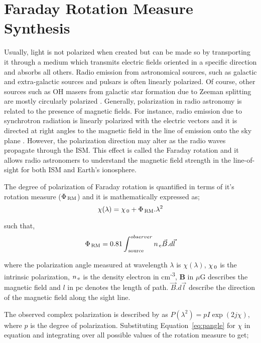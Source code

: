 \section{Faraday Rotation Measure Synthesis}	    \label{chap3:Faraday}
Usually, light is not polarized when created but can be made so by transporting it through a medium which transmits electric fields oriented in a specific direction and absorbs all others. 
Radio emission from astronomical sources, such as galactic and extra-galactic sources and pulsars is often linearly polarized. Of course, other sources such as OH masers from galactic star formation due to Zeeman splitting 
are mostly circularly polarized \citep{2008ApJ...680..981R}. Generally, polarization in radio astronomy is related to the presence of magnetic fields. 
For instance, radio emission due to synchrotron radiation is linearly polarized with the electric vectors and it is directed at right angles to the magnetic field in the line of emission 
onto the sky plane \citep{2012A&A...540A..80B}. However, the polarization direction may alter as the radio waves
propagate through the ISM. This effect is called the Faraday rotation and it allows radio astronomers to understand the magnetic field strength in the line-of-sight for both ISM and
Earth's ionosphere.

The degree of polarization of Faraday rotation is quantified in terms of it's rotation measure ($\Phi_{\rm \, RM}$) and it is mathematically expressed as;
\begin{equation}\label{eq:pangle}
\chi(\lambda) = \chi_{\rm \, 0} + \Phi_{\rm \, RM}.\lambda^2 
\end{equation}

such that, 
 \begin{equation}\label{eq:rm}
  \Phi_{\rm \, RM} = 0.81 \int_{\rm \, source}^{observer} n_{\rm \, e} \vec{B}.d \vec{l}	
 \end{equation}

\noindent where the polarization angle measured at wavelength $\lambda$ is $\chi(\lambda)$, $\chi_{\rm \, 0}$ is the intrinsic polarization,
$n_{\rm \, e}$ is the density electron in cm\textsuperscript{-3}, $\mathbf{B}$ in $\mu$G describes the magnetic field  and $l$ in pc denotes the length of path.
 $\vec{B}.d \vec{l}$ describe the direction of the magnetic field along the sight line.


The observed complex polarization is described by \citep{1966MNRAS.133...67B} as $P(\lambda^2) = pI\exp(2j\chi)$, where $p$ is the degree of polarization. Substituting 
Equation~\ref{eq:pangle} for $\chi$ in \citep{1966MNRAS.133...67B} equation and integrating over all possible values of the rotation measure to get;

